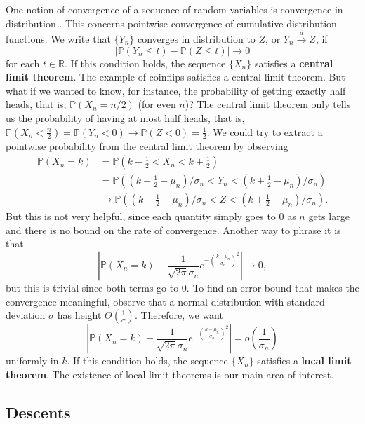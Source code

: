 \documentclass[12pt]{article} %
\newcommand{\f}[2]{\frac{#1}{#2}}
\newcommand{\p}[1]{\left(#1\right)}
\newcommand{\abs}[1]{\left\lvert#1\right\rvert}
\newcommand{\R}{\mathbb{R}}
\renewcommand{\P}{\mathbb{P}}
\theoremstyle{definition}
\theoremstyle{remark}
\begin{document}
One notion of convergence of a sequence of random variables is convergence in distribution \cite{Chatterjee07}. This concerns pointwise convergence of cumulative distribution functions. We write that $\{Y_n\}$ converges in distribution to $Z$, or $Y_n \xrightarrow{d} Z$, if
\[ \abs{\P(Y_n \leq t) - \P(Z \leq t)} \to 0 \]
for each $t \in \R$. If this condition holds, the sequence $\{X_n\}$ satisfies a \textbf{central limit theorem}. The example of coinflips satisfies a central limit theorem. But what if we wanted to know, for instance, the probability of getting exactly half heads, that is, $\P(X_n = n/2)$ (for even $n$)? The central limit theorem only tells us the probability of having at most half heads, that is, $\P(X_n < \f{n}{2}) = \P(Y_n < 0) \to \P(Z < 0) = \f{1}{2}$. We could try to extract a pointwise probability from the central limit theorem by observing
\begin{align*}
	\P(X_n = k)
	&= \P(k - \f{1}{2} < X_n < k + \f{1}{2}) \\
	&= \P((k - \f{1}{2} - \mu_n)/\sigma_n < Y_n < (k + \f{1}{2} - \mu_n)/\sigma_n) \\
	&\to \P((k - \f{1}{2} - \mu_n)/\sigma_n < Z < (k + \f{1}{2} - \mu_n)/\sigma_n).
\end{align*}
But this is not very helpful, since each quantity simply goes to $0$ as $n$ gets large and there is no bound on the rate of convergence. Another way to phrase it is that
\[ \abs{\P(X_n = k) - \f{1}{\sqrt{2\pi}\sigma_n} e^{-\p{\f{k - \mu_n}{\sigma_n}}^2}} \to 0, \]
but this is trivial since both terms go to $0$. To find an error bound that makes the convergence meaningful, observe that a normal distribution with standard deviation $\sigma$ has height $\Theta(\f{1}{\sigma})$. Therefore, we want
\[ \abs{\P(X_n = k) - \f{1}{\sqrt{2\pi}\sigma_n} e^{-\p{\f{k - \mu_n}{\sigma_n}}^2}} = o\p{\f{1}{\sigma_n}} \]
uniformly in $k$. If this condition holds, the sequence $\{X_n\}$ satisfies a \textbf{local limit theorem}. The existence of local limit theorems is our main area of interest.

\subsection{Descents}
\end{document}
